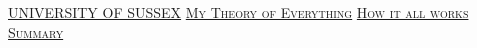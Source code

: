 \newpage
\begin{center}
\large
\underline{UNIVERSITY OF SUSSEX}
\vskip20mm
\vskip20mm
\underline{\textsc{My Theory of Everything}}
\vskip0mm
\underline{\textsc{How it all works}}
\vskip20mm
\underline{\textsc{Summary}}
\vskip2mm
\end{center}
\small\normalsize

